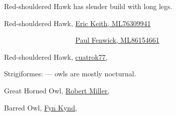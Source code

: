 \documentclass[t]{beamer}
\begin{document}
%
%

{
\begin{frame}{Red-shouldered Hawk has slender build with long legs.}


\tinyfill Red-shouldered Hawk, \href{https://macaulaylibrary.org/asset/76309941}{Eric Keith, ML76309941}
\end{frame}
}

{
\begin{frame}


\tinyfill \textcolor{white}{Red-shouldered Hawk, \href{https://macaulaylibrary.org/asset/86154661}{Paul Fenwick, ML86154661}}
\end{frame}
}

{
\begin{frame}


\tinyfill Red-shouldered Hawk, \href{https://flickr.com/photos/cuatrok77/8535844534}{cuatrok77, }
\end{frame}
}


{
\begin{frame}{Strigiformes:  — owls are mostly nocturnal.}


\vfilll 



\tiny \colorbox[gray]{0.9}{\parbox{0.3\textwidth}{Great Horned Owl,  \href{https://flickr.com/photos/12463666@N03/32547241817}{Robert Miller, }}}
 \hfill Barred Owl, \href{https://flickr.com/photos/79452129@N02/30833383633}{Fyn Kynd, }
\end{frame}
}
\end{document}
